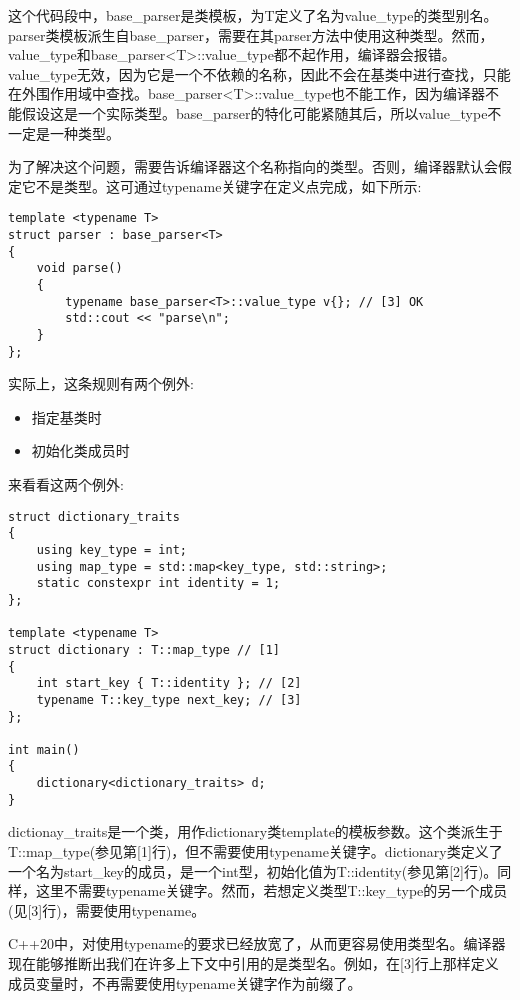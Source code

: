 这个代码段中，base\_parser是类模板，为T定义了名为value\_type的类型别名。parser类模板派生自base\_parser，需要在其parser方法中使用这种类型。然而，value\_type和base\_parser<T>::value\_type都不起作用，编译器会报错。value\_type无效，因为它是一个不依赖的名称，因此不会在基类中进行查找，只能在外围作用域中查找。base\_parser<T>::value\_type也不能工作，因为编译器不能假设这是一个实际类型。base\_parser的特化可能紧随其后，所以value\_type不一定是一种类型。

为了解决这个问题，需要告诉编译器这个名称指向的类型。否则，编译器默认会假定它不是类型。这可通过typename关键字在定义点完成，如下所示:

\begin{lstlisting}[style=styleCXX]
template <typename T>
struct parser : base_parser<T>
{
	void parse()
	{
		typename base_parser<T>::value_type v{}; // [3] OK
		std::cout << "parse\n";
	}
};
\end{lstlisting}

实际上，这条规则有两个例外:

\begin{itemize}
\item
指定基类时

\item
初始化类成员时
\end{itemize}

来看看这两个例外:

\begin{lstlisting}[style=styleCXX]
struct dictionary_traits
{
	using key_type = int;
	using map_type = std::map<key_type, std::string>;
	static constexpr int identity = 1;
};

template <typename T>
struct dictionary : T::map_type // [1]
{
	int start_key { T::identity }; // [2]
	typename T::key_type next_key; // [3]
};

int main()
{
	dictionary<dictionary_traits> d;
}
\end{lstlisting}

dictionay\_traits是一个类，用作dictionary类template的模板参数。这个类派生于T::map\_type(参见第[1]行)，但不需要使用typename关键字。dictionary类定义了一个名为start\_key的成员，是一个int型，初始化值为T::identity(参见第[2]行)。同样，这里不需要typename关键字。然而，若想定义类型T::key\_type的另一个成员(见[3]行)，需要使用typename。

C++20中，对使用typename的要求已经放宽了，从而更容易使用类型名。编译器现在能够推断出我们在许多上下文中引用的是类型名。例如，在[3]行上那样定义成员变量时，不再需要使用typename关键字作为前缀了。

